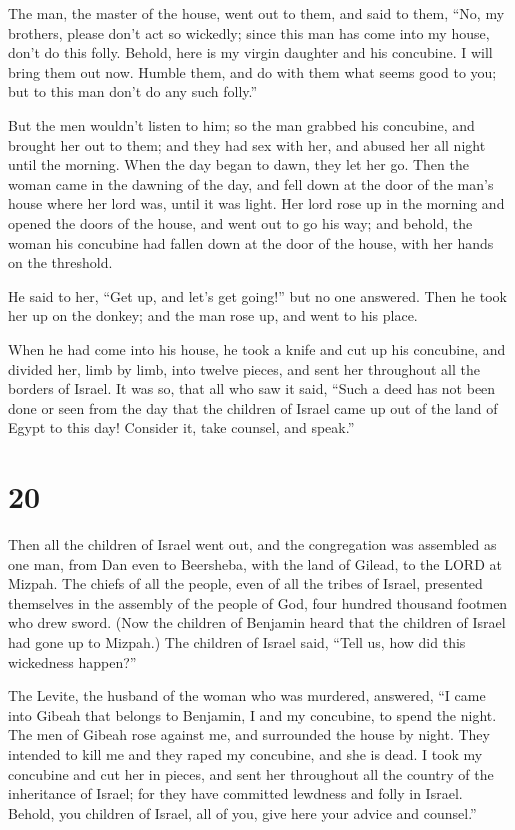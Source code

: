 The man, the master of the house, went out to them, and
said to them, ``No, my brothers, please don't act so wickedly; since
this man has come into my house, don't do this folly. 
Behold, here is my virgin daughter and his concubine. I will bring them
out now. Humble them, and do with them what seems good to you; but to
this man don't do any such folly.''

 But the men wouldn't listen to him; so the man grabbed his
concubine, and brought her out to them; and they had sex with her, and
abused her all night until the morning. When the day began to dawn, they
let her go.  Then the woman came in the dawning of the day,
and fell down at the door of the man's house where her lord was, until
it was light.  Her lord rose up in the morning and opened
the doors of the house, and went out to go his way; and behold, the
woman his concubine had fallen down at the door of the house, with her
hands on the threshold.

 He said to her, ``Get up, and let's get going!'' but no
one answered. Then he took her up on the donkey; and the man rose up,
and went to his place.

 When he had come into his house, he took a knife and cut
up his concubine, and divided her, limb by limb, into twelve pieces, and
sent her throughout all the borders of Israel.  It was so,
that all who saw it said, ``Such a deed has not been done or seen from
the day that the children of Israel came up out of the land of Egypt to
this day! Consider it, take counsel, and speak.''

\hypertarget{section-19}{%
\section{20}\label{section-19}}

 Then all the children of Israel went out, and the
congregation was assembled as one man, from Dan even to Beersheba, with
the land of Gilead, to the LORD at Mizpah.  The chiefs of
all the people, even of all the tribes of Israel, presented themselves
in the assembly of the people of God, four hundred thousand footmen who
drew sword.  (Now the children of Benjamin heard that the
children of Israel had gone up to Mizpah.) The children of Israel said,
``Tell us, how did this wickedness happen?''

 The Levite, the husband of the woman who was murdered,
answered, ``I came into Gibeah that belongs to Benjamin, I and my
concubine, to spend the night.  The men of Gibeah rose
against me, and surrounded the house by night. They intended to kill me
and they raped my concubine, and she is dead.  I took my
concubine and cut her in pieces, and sent her throughout all the country
of the inheritance of Israel; for they have committed lewdness and folly
in Israel.  Behold, you children of Israel, all of you, give
here your advice and counsel.''


